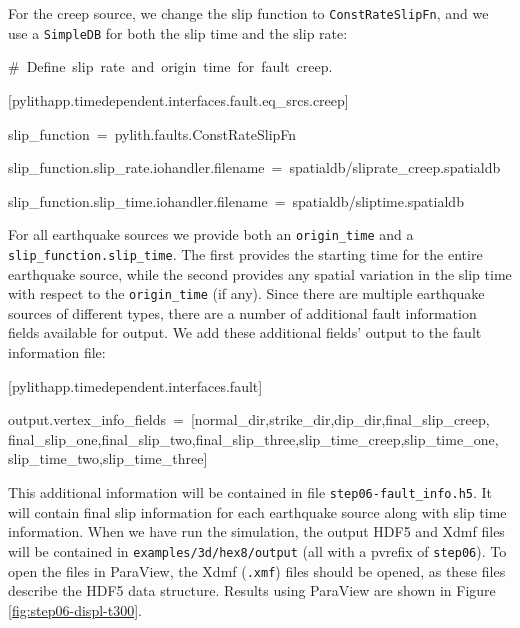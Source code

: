 For the creep source, we change the slip function to \texttt{ConstRateSlipFn},
and we use a \texttt{SimpleDB} for both the slip time and the slip
rate:
\begin{lyxcode}
\#~Define~slip~rate~and~origin~time~for~fault~creep.

{[}pylithapp.timedependent.interfaces.fault.eq\_srcs.creep{]}

slip\_function~=~pylith.faults.ConstRateSlipFn

slip\_function.slip\_rate.iohandler.filename~=~spatialdb/sliprate\_creep.spatialdb

slip\_function.slip\_time.iohandler.filename~=~spatialdb/sliptime.spatialdb
\end{lyxcode}
For all earthquake sources we provide both an \texttt{origin\_time}
and a \texttt{slip\_function.slip\_time}. The first provides the starting
time for the entire earthquake source, while the second provides any
spatial variation in the slip time with respect to the \texttt{origin\_time}
(if any). Since there are multiple earthquake sources of different
types, there are a number of additional fault information fields available
for output. We add these additional fields' output to the fault information
file:
\begin{lyxcode}
{[}pylithapp.timedependent.interfaces.fault{]}

output.vertex\_info\_fields~=~{[}normal\_dir,strike\_dir,dip\_dir,final\_slip\_creep,~\\
final\_slip\_one,final\_slip\_two,final\_slip\_three,slip\_time\_creep,slip\_time\_one,~\\
slip\_time\_two,slip\_time\_three{]}
\end{lyxcode}
This additional information will be contained in file \texttt{step06-fault\_info.h5}.
It will contain final slip information for each earthquake source
along with slip time information. When we have run the simulation,
the output HDF5 and Xdmf files will be contained in \texttt{examples/3d/hex8/output}
(all with a pvrefix of \texttt{step06}). To open the files in ParaView,
the Xdmf (\texttt{.xmf}) files should be opened, as these files describe
the HDF5 data structure. Results using ParaView are shown in Figure
\vref{fig:step06-displ-t300}.
